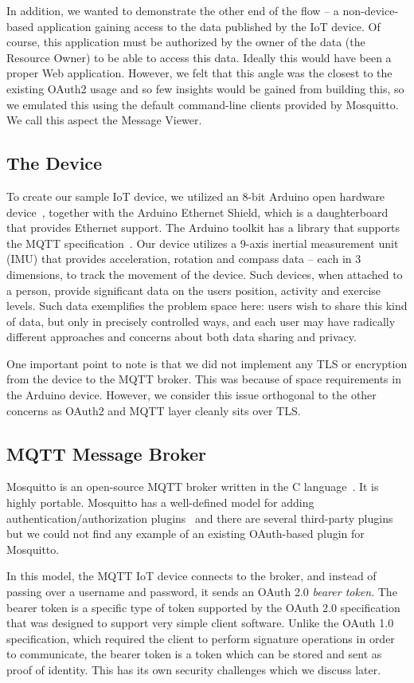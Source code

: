 \documentclass{llncs}
\newif\iflong
\begin{document}
In addition, we wanted to demonstrate the other end of the flow -- a non-device-based application gaining 
access to the data published by the IoT device. Of course, this application must be 
authorized by the owner of the data (the Resource Owner) to be able to access this data. Ideally this
would have been a proper Web application. However, we felt that this angle was the closest to the existing 
OAuth2 usage and so few insights would be gained from building this, so we emulated
this using the default command-line clients provided by Mosquitto. We call this aspect the Message Viewer.

\subsection{The Device}
To create our sample IoT device, we utilized an 8-bit Arduino open hardware device~\cite{arduino}, together
with the Arduino Ethernet Shield, which is a daughterboard that provides Ethernet support. 
The Arduino toolkit has a library that supports the MQTT specification~\cite{pubsubclient}.
Our device utilizes a 9-axis inertial measurement unit (IMU) that provides acceleration, rotation and
compass data -- each in 3 dimensions, to track the movement of the device. Such devices, when 
attached to a person, provide significant data on the users position, activity and exercise levels. Such
data exemplifies the problem space here: users wish to share this kind of data, but only in precisely 
controlled ways, and each user may have radically different approaches and concerns about both
data sharing and privacy. 

One important point to note is that we did not implement any TLS or encryption from the device to the MQTT broker. This was because of space requirements in the Arduino device. However, we consider this issue orthogonal to the other concerns as OAuth2 and MQTT layer cleanly sits over TLS.

\subsection{MQTT Message Broker}
Mosquitto is an open-source MQTT broker written in the C language~\cite{mosquitto}. It is highly portable. Mosquitto has a well-defined model for
adding authentication/authorization plugins~\cite{mosquitto-auth} and there are several third-party
plugins but we could not find any 
example of an existing OAuth-based plugin for Mosquitto. 

In this model, the MQTT IoT device connects to the broker, and instead of passing over a username 
and password, it sends an OAuth 2.0 \emph{bearer token}. 
The bearer token is a specific type of 
token supported by the OAuth 2.0 specification that was designed to support very simple client 
software. Unlike the OAuth 1.0 specification, which required the client to perform signature 
operations in order to communicate, the bearer token is a token which can be stored and sent
as proof of identity. This has its own security challenges which we discuss later.
\end{document}
